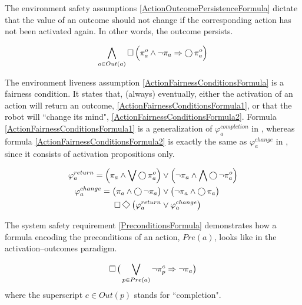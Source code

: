The environment safety assumptions \eqref{ActionOutcomePersistenceFormula} dictate that the value of an outcome should not change if the corresponding action has not been activated again. 
In other words, the outcome persists.

\begin{equation}\label{ActionOutcomePersistenceFormula}
	\bigwedge \limits_{o \in Out(a)} \operatorname{\Box} \Big( \pi_a^o \wedge \lnot \pi_a \Rightarrow \operatorname{\bigcirc} \pi_a^o \Big)
\end{equation}

The environment liveness assumption \eqref{ActionFairnessConditionsFormula} is a fairness condition.
It states that, (always) eventually, either the activation of an action will return an outcome, \eqref{ActionFairnessConditionsFormula1}, or that the robot will ``change its mind", \eqref{ActionFairnessConditionsFormula2}.
Formula \eqref{ActionFairnessConditionsFormula1} is a generalization of $\varphi_a^{completion}$ in \cite{Vasu2013ICRA}, whereas formula \eqref{ActionFairnessConditionsFormula2} is exactly the same as $\varphi_a^{change}$ in \cite{Vasu2013ICRA}, since it consists of activation propositions only.

\begin{subequations}
	\begin{align}
		\varphi_a^{return} = \Big( \pi_a \wedge \bigvee \LTLX \pi_a^o \Big) &\vee \Big( \lnot \pi_a \wedge \bigwedge \LTLX \lnot \pi_a^o \Big)\label{ActionFairnessConditionsFormula1}\\
		\varphi_a^{change} = \big( \pi_a \wedge \LTLX \lnot \pi_a \big) &\vee \big( \lnot \pi_a \wedge \LTLX \pi_a \big)\label{ActionFairnessConditionsFormula2}\\
		\LTLG \LTLF \big( \varphi_a^{return} &\vee \varphi_a^{change} \big)\label{ActionFairnessConditionsFormula}
	\end{align}
\end{subequations}

The system safety requirement \eqref{PreconditionsFormula} demonstrates how a formula encoding the preconditions of an action, $Pre(a)$, looks like in the activation--outcomes paradigm.

\begin{equation}\label{PreconditionsFormula}
	\operatorname{\Box} \big( \bigvee \limits_{p \in Pre(a)} \lnot \pi_p^c \Rightarrow \lnot \pi_a \big)
\end{equation}
where the superscript $c \in Out(p)$ stands for ``completion".

